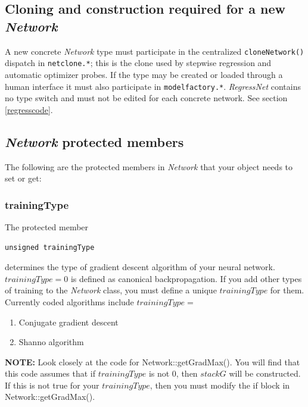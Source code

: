 \documentclass{report}
\begin{document}
\subsection{Cloning and construction required for a new {\em Network}}

A new concrete {\em Network} type must participate in the centralized
\texttt{cloneNetwork()} dispatch in \texttt{netclone.*}; this is the clone used
by stepwise regression and automatic optimizer probes.  If the type may be
created or loaded through a human interface it must also participate in
\texttt{modelfactory.*}.  {\em RegressNet} contains no type switch and must not
be edited for each concrete network.  See section \ref{regresscode}.

\subsection{{\em Network} protected members}

The following are the protected members in {\em Network} that your
object needs to set or get:

\subsubsection{trainingType}

The protected member

\begin{verbatim}
unsigned trainingType
\end{verbatim}

determines the type of gradient descent algorithm of your neural
network. $trainingType = 0$ is defined as canonical backpropagation.
If you add other types of training to the {\em Network} class, you
must define a unique $trainingType$ for them.  Currently coded
algorithms include $trainingType =$

\begin{enumerate}
\item Conjugate gradient descent
\item Shanno algorithm
\end{enumerate}

{\bf NOTE:} Look closely at the code for Network::getGradMax(). You
will find that this code assumes that if $trainingType$ is not 0, then
$stackG$ will be constructed.  If this is not true for your
$trainingType$, then you must modify the if block in
Network::getGradMax().
\end{document}

